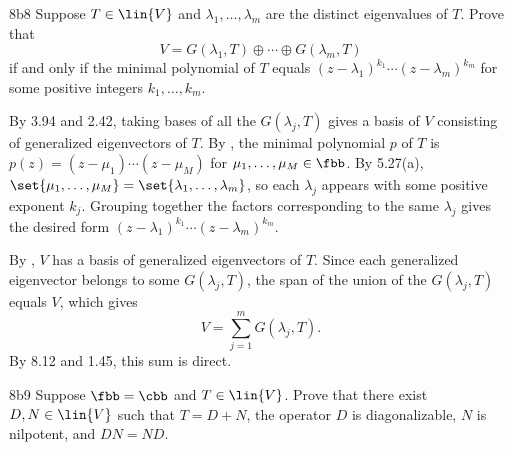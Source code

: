 \begin{exercise}{8b8}
    Suppose $T \in \lin{V}$ and $\lambda_1, \ldots, \lambda_m$ are the distinct eigenvalues of $T$.
    Prove that
    \[
        V = G(\lambda_1, T) \oplus \cdots \oplus G(\lambda_m, T)
    \]
    if and only if the minimal polynomial of $T$ equals $(z - \lambda_1)^{k_1} \cdots (z - \lambda_m)^{k_m}$ for some positive integers $k_1, \ldots, k_m$.

\end{exercise}

\begin{soliff}
    \rightimp By 3.94 and 2.42, taking bases of all the $G(\lambda_j, T)$ gives a basis of $V$ consisting of generalized eigenvectors of $T$.
    By , the minimal polynomial $p$ of $T$ is $p(z) = (z - \mu_1) \cdots (z - \mu_M)$ for $\mu_1, \ldots, \mu_M \in \fbb$.
    By 5.27(a), $\set{\mu_1, \ldots, \mu_M} = \set{\lambda_1, \ldots, \lambda_m}$, so each $\lambda_j$ appears with some positive exponent $k_j$.
    Grouping together the factors corresponding to the same $\lambda_j$ gives the desired form $(z - \lambda_1)^{k_1} \cdots (z - \lambda_m)^{k_m}$.

    \leftimp By , $V$ has a basis of generalized eigenvectors of $T$.
    Since each generalized eigenvector belongs to some $G(\lambda_j, T)$, the span of the union of the $G(\lambda_j, T)$ equals $V$, which gives
    \[
        V = \sum_{j=1}^m G(\lambda_j, T).
    \]
    By 8.12 and 1.45, this sum is direct.
\end{soliff}

\begin{exercise}{8b9}
    Suppose $\fbb = \cbb$ and $T \in \lin{V}$.
    Prove that there exist $D, N \in \lin{V}$ such that $T = D + N$, the operator $D$ is diagonalizable, $N$ is nilpotent, and $DN = ND$.
\end{exercise}


